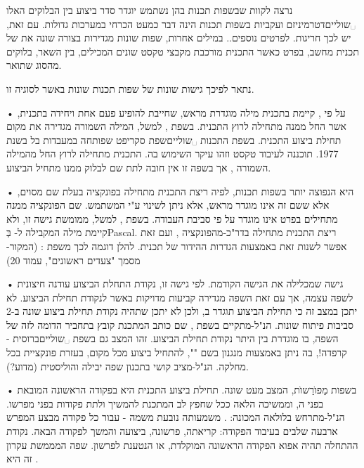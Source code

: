 נרצה לקוות שבשפות תכנות בהן נשתמש יוגדר סדר ביצוע בין הבלוקים האלו
␣שוליים{דטרמיניזם ועקביות בשפות תכנות הינה דבר כמעט הכרחי במערכות גדולות.
עם זאת, יש לכך חריגות. לפרטים נוספים.}. במילים אחרות, שפות שונות מגדירות בצורה
שונה את  של תכנית מחשב, בפרט כאשר התכנית מורכבת
מקבצי טקסט שונים המכילים, בין השאר, בלוקים מהסוג שתואר.

נתאר לפיכך גישות שונות של שפות תכנות שונות באשר לסוגיה זו.
\begin{enumerate}
• על פי , קיימת בתכנית מילה
מוגדרת מראש, שחייבת להופיע פעם אחת ויחידה בתכנית, אשר החל ממנה מתחילה לרוץ
התכנית. בשפת , למשל, המילה השמורה  מגדירה את מקום תחילת
ביצוע התכנית. בשפת התכנות ␣שוליים{שפת סקריפט שפותחה במעבדות בל
בשנת 1977. תוכננה לעיבוד טקסט וזהו עיקר השימוש בה.} התכנית מתחילה לרוץ החל
מהמילה השמורה , אך בשפה זו אין חובה לתת שם לבלוק ממנו מתחיל הביצוע.

•   היא הנפוצה יותר
בשפות תכנות, לפיה ריצת התכנית מתחילה בפונקציה בעלת שם מסוים, אלא ששם זה אינו
מוגדר מראש, אלא ניתן לשינוי ע"י המשתמש. שם הפונקציה ממנה מתחילים בפרט אינו
מוגדר על פי סביבת העבודה. בשפת , למשל, ממומשת גישה זו, ולא קיימת מילה
המקבילה ל- בְּPascal. ריצת התכנית מתחילה בדר"כ-מהפונקציה ,
ועם זאת אפשר לשנות זאת באמצעות הגדרות ההידור של תכנית. להלן דוגמה לכך משפת :
(המקור- מסמך "צעדים ראשונים", עמוד 20)



•  גישה שמכלילה את הגישה הקודמת. לפי גישה זו,
נקודת התחלת הביצוע עודנה חיצונית לשפה עצמה, אך עם זאת השפה מגדירה קביעות
מדויקות באשר לנקודת תחילת הביצוע. לא יתכן במצב זה כי תחילת הביצוע תוגדר
ב, ולכן לא יתכן שתהיה נקודת תחילת ביצוע שונה ב-2 סביבות
פיתוח שונות. הנ"ל-מתקיים בשפת , שם כותב המתכנת קובץ בתחביר הדומה לזה
של השפה, בו מוגדרת בין היתר נקודת תחילת הביצוע. זהו המצב גם בשפת
␣שוליים{ברוסית - קרפדה!}, בה ניתן באמצעות מנגנון בשם "", להתחיל ביצוע מכל מקום, בעזרת פונקציית  בכל מחלקה.
הנ"ל-מציב קושי בתכנון שפה יבילה והוליסטית (מדוע?).

•  בשפות מֵפוׂרַשוׂת, המצב מעט
שונה. תחילת ביצוע התכנית היא בפקודה הראשונה המובאת בפני ה, וממשיכה
הלאה ככל שחפץ לב המתכנת להמשיך ולתת פקודות בפני מפרשו. הנ"ל-מתרחש בלולאה
המכונה: . משמעותה נובעת משמה - עבור כל
פקודה מבצע המפרש ארבעה שלבים בעיבוד הפקודה: קריאתה, פרשונה, ביצועה והמשך לפקודה
הבאה. נקודת ההתחלה תהיה אפוא הפקודה הראשונה המוקלדת, או הנטענת לפרשון. שפה
המממשת עקרון זה היא .

\end{enumerate}

